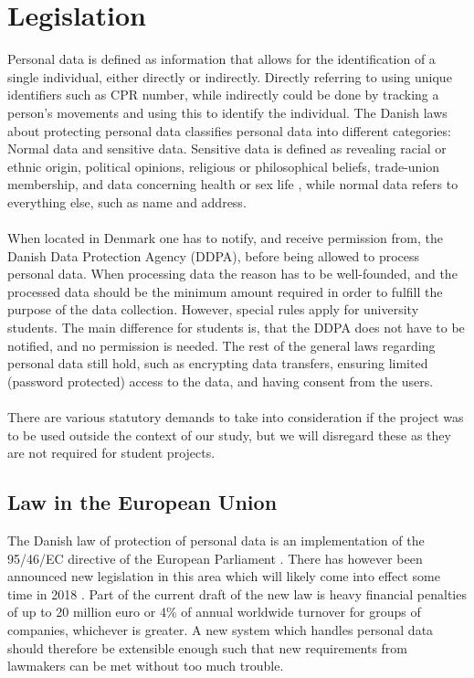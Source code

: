 
\section{Legislation}
\label{sec:legislation}

Personal data is defined as information that allows for the identification of a single individual, either directly or indirectly. Directly referring to using unique identifiers such as CPR number, while indirectly could be done by tracking a person's movements and using this to identify the individual. The Danish laws about protecting personal data classifies personal data into different categories: Normal data and sensitive data. Sensitive data is defined as revealing racial or ethnic origin, political opinions, religious or philosophical beliefs, trade-union membership, and data concerning health or sex life \parencite{datatilsynet_stud1}, while normal data refers to everything else, such as name and address.  
\\\\
When located in Denmark one has to notify, and receive permission from, the Danish Data Protection Agency (DDPA), before being allowed to process personal data. When processing data the reason has to be well-founded, and the processed data should be the minimum amount required in order to fulfill the purpose of the data collection. However, special rules apply for university students. The main difference for students is, that the DDPA does not have to be notified, and no permission is needed. The rest of the general laws regarding personal data still hold, such as encrypting data transfers, ensuring limited (password protected) access to the data, and having consent from the users. 
\\\\
There are various statutory demands to take into consideration if the project was to be used outside the context of our study, but we will disregard these as they are not required for student projects. 

\subsection{Law in the European Union}

The Danish law of protection of personal data is an implementation of the 95/46/EC directive of the European Parliament \parencite{eu_personal_data_law}. There has however been announced new legislation in this area which will likely come into effect some time in 2018 \parencite{eu_data_law_changing}. Part of the current draft of the new law is heavy financial penalties of up to 20 million euro or 4\% of annual worldwide turnover for groups of companies, whichever is greater. A new system which handles personal data should therefore be extensible enough such that new requirements from lawmakers can be met without too much trouble. 

